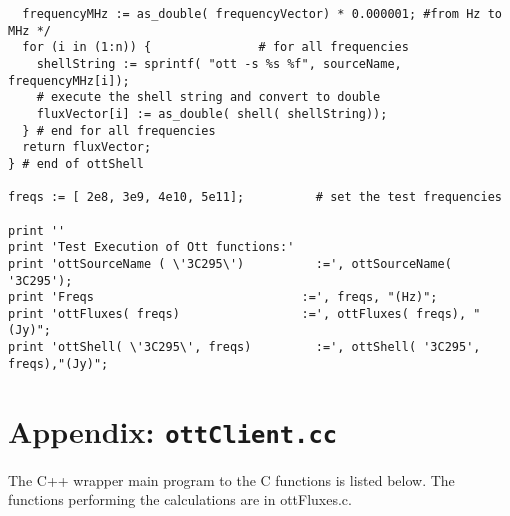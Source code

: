 \begin{verbatim}
  frequencyMHz := as_double( frequencyVector) * 0.000001; #from Hz to MHz */
  for (i in (1:n)) {               # for all frequencies
    shellString := sprintf( "ott -s %s %f", sourceName, frequencyMHz[i]);
    # execute the shell string and convert to double
    fluxVector[i] := as_double( shell( shellString));
  } # end for all frequencies
  return fluxVector;
} # end of ottShell

freqs := [ 2e8, 3e9, 4e10, 5e11];          # set the test frequencies

print ''
print 'Test Execution of Ott functions:'
print 'ottSourceName ( \'3C295\')          :=', ottSourceName( '3C295');
print 'Freqs                             :=', freqs, "(Hz)";
print 'ottFluxes( freqs)                 :=', ottFluxes( freqs), "(Jy)";
print 'ottShell( \'3C295\', freqs)         :=', ottShell( '3C295', freqs),"(Jy)";

\end{verbatim}

\section{Appendix: {\tt ottClient.cc}}
The C++ wrapper main program to the C functions is listed below.
The functions performing the calculations are in ottFluxes.c.

